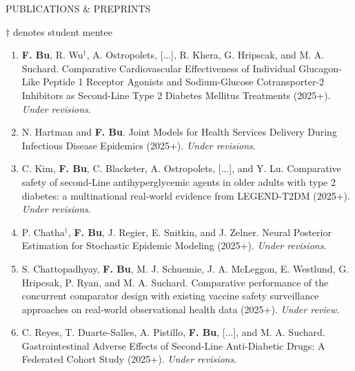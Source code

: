 \documentclass{resume} %
\newcommand{\myName}[1]{\textbf{#1}}
\begin{document}



\begin{rSection}{PUBLICATIONS \& PREPRINTS}

{\footnotesize $\dagger$ denotes student mentee}

\setcounter{pubtotal}{27}

\begin{enumerate}[{label=\arabic*\addtocounter{enumi}{-2}., itemsep=3pt, parsep=0pt, topsep=3pt, start=\value{pubtotal}, leftmargin=0pt}]
	
	\item \myName{F. Bu}, R. Wu$^\dagger$, A. Ostropolets, [...], R. Khera, G. Hripscak, and M. A. Suchard. Comparative Cardiovascular Effectiveness of Individual Glucagon-Like Peptide 1 Receptor Agonists and Sodium-Glucose Cotransporter-2 Inhibitors as Second-Line Type 2 Diabetes Mellitus Treatments (2025+). \emph{Under revisions}. 
	
	\item 
	N. Hartman and \myName{F. Bu}. Joint Models for Health Services Delivery During Infectious Disease Epidemics (2025+). \emph{Under revisions}. 
	
	\item C. Kim, \myName{F. Bu}, C. Blacketer, A. Ostropolets, [...], and Y. Lu. Comparative safety of second-Line antihyperglycemic agents in older adults with type 2 diabetes: a multinational real-world evidence from LEGEND-T2DM (2025+). \emph{Under revisions}.
	
	\item P. Chatha$^\dagger$, \myName{F. Bu}, J. Regier, E. Snitkin, and J. Zelner. 
	Neural Posterior Estimation for Stochastic Epidemic Modeling (2025+). \emph{Under revisions}.
	
	\item  S. Chattopadhyay, \myName{F. Bu}, M. J. Schuemie, J. A. McLeggon, E. Westlund, G. Hripcsak, P. Ryan, and M. A. Suchard. 
	Comparative performance of the concurrent comparator design with existing vaccine safety surveillance approaches on real-world observational health data (2025+). \emph{Under review}. 
	
	\item C. Reyes, T. Duarte-Salles, A. Pistillo, \myName{F. Bu}, [...], and M. A. Suchard. Gastrointestinal Adverse Effects of Second-Line Anti-Diabetic Drugs: A Federated Cohort Study (2025+). \emph{Under revisions}. 
	

\end{enumerate}
\end{rSection}
\end{document}
